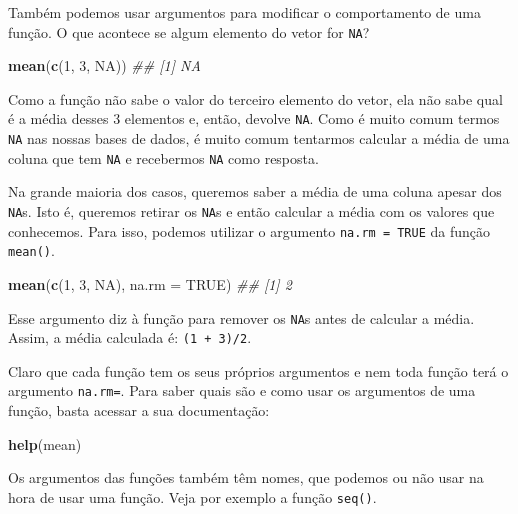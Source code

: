 \documentclass[]{book}
\newenvironment{Shaded}{\begin{snugshade}}{\end{snugshade}}
\newcommand{\CommentTok}[1]{\textcolor[rgb]{0.56,0.35,0.01}{\textit{#1}}}
\newcommand{\DataTypeTok}[1]{\textcolor[rgb]{0.13,0.29,0.53}{#1}}
\newcommand{\DecValTok}[1]{\textcolor[rgb]{0.00,0.00,0.81}{#1}}
\newcommand{\KeywordTok}[1]{\textcolor[rgb]{0.13,0.29,0.53}{\textbf{#1}}}
\newcommand{\NormalTok}[1]{#1}
\newcommand{\OtherTok}[1]{\textcolor[rgb]{0.56,0.35,0.01}{#1}}
\begin{document}
Também podemos usar argumentos para modificar o comportamento de uma função. O que acontece se algum elemento do vetor for \texttt{NA}?

\begin{Shaded}
\begin{Highlighting}[]
\KeywordTok{mean}\NormalTok{(}\KeywordTok{c}\NormalTok{(}\DecValTok{1}\NormalTok{, }\DecValTok{3}\NormalTok{, }\OtherTok{NA}\NormalTok{))}
\CommentTok{## [1] NA}
\end{Highlighting}
\end{Shaded}

Como a função não sabe o valor do terceiro elemento do vetor, ela não sabe qual é a média desses 3 elementos e, então, devolve \texttt{NA}. Como é muito comum termos \texttt{NA} nas nossas bases de dados, é muito comum tentarmos calcular a média de uma coluna que tem \texttt{NA} e recebermos \texttt{NA} como resposta.

Na grande maioria dos casos, queremos saber a média de uma coluna apesar dos \texttt{NA}s. Isto é, queremos retirar os \texttt{NA}s e então calcular a média com os valores que conhecemos. Para isso, podemos utilizar o argumento \texttt{na.rm\ =\ TRUE} da função \texttt{mean()}.

\begin{Shaded}
\begin{Highlighting}[]
\KeywordTok{mean}\NormalTok{(}\KeywordTok{c}\NormalTok{(}\DecValTok{1}\NormalTok{, }\DecValTok{3}\NormalTok{, }\OtherTok{NA}\NormalTok{), }\DataTypeTok{na.rm =} \OtherTok{TRUE}\NormalTok{)}
\CommentTok{## [1] 2}
\end{Highlighting}
\end{Shaded}

Esse argumento diz à função para remover os \texttt{NA}s antes de calcular a média. Assim, a média calculada é: \texttt{(1\ +\ 3)/2}.

Claro que cada função tem os seus próprios argumentos e nem toda função terá o argumento \texttt{na.rm=}. Para saber quais são e como usar os argumentos de uma função, basta acessar a sua documentação:

\begin{Shaded}
\begin{Highlighting}[]
\KeywordTok{help}\NormalTok{(mean)}
\end{Highlighting}
\end{Shaded}

Os argumentos das funções também têm nomes, que podemos ou não usar na hora de usar uma função. Veja por exemplo a função \texttt{seq()}.
\end{document}
